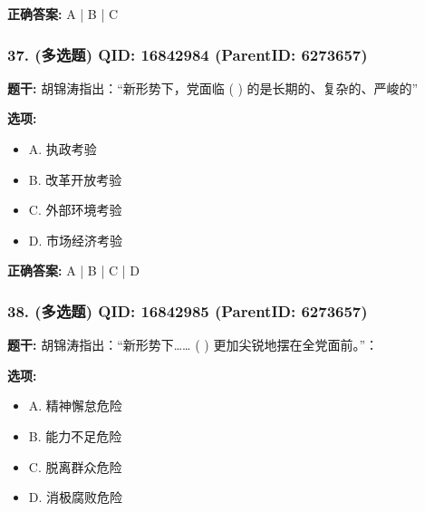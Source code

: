 \documentclass[12pt,UTF8]{ctexart}
\begin{document}
\textbf{正确答案:}
A | B | C

\vspace{0.3em}\hrulefill\vspace{0.7em}

\subsubsection*{37. (多选题) \small QID: 16842984 (ParentID: 6273657)}

\textbf{题干:}
胡锦涛指出：“新形势下，党面临 ( ) 的是长期的、复杂的、严峻的”



\textbf{选项:}
\begin{itemize}[leftmargin=*]

  \item A. 执政考验

  \item B. 改革开放考验

  \item C. 外部环境考验

  \item D. 市场经济考验

\end{itemize}

\textbf{正确答案:}
A | B | C | D

\vspace{0.3em}\hrulefill\vspace{0.7em}

\subsubsection*{38. (多选题) \small QID: 16842985 (ParentID: 6273657)}

\textbf{题干:}
胡锦涛指出：“新形势下……  ( ) 更加尖锐地摆在全党面前。”：



\textbf{选项:}
\begin{itemize}[leftmargin=*]

  \item A. 精神懈怠危险

  \item B. 能力不足危险

  \item C. 脱离群众危险

  \item D. 消极腐败危险

\end{itemize}
\end{document}
